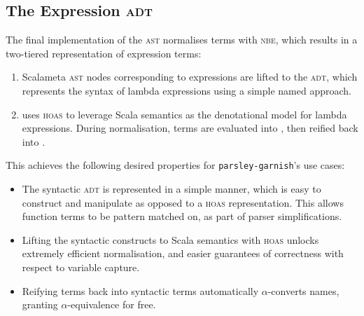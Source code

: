 \documentclass[../../../main.tex]{subfiles}
\begin{document}
\subsection{The Expression \textsc{adt}}
The final implementation of the  \textsc{ast} normalises terms with \textsc{nbe}, which results in a two-tiered representation of expression terms:
\begin{enumerate}
  \item Scalameta \textsc{ast} nodes corresponding to expressions are lifted to the  \textsc{adt}, which represents the syntax of lambda expressions using a simple named approach.
  \item {} uses \textsc{hoas} to leverage Scala semantics as the denotational model for lambda expressions. During normalisation,  terms are evaluated into , then reified back into .
\end{enumerate}
%
This achieves the following desired properties for \texttt{parsley-garnish}'s use cases:
\begin{itemize}
  \item The syntactic  \textsc{adt} is represented in a simple manner, which is easy to construct and manipulate as opposed to a \textsc{hoas} representation. This allows function terms to be pattern matched on, as part of parser simplifications.
  \item Lifting the syntactic constructs to Scala semantics with \textsc{hoas} unlocks extremely efficient normalisation, and easier guarantees of correctness with respect to variable capture.
  \item Reifying  terms back into syntactic  terms automatically $\alpha$-converts names, granting $\alpha$-equivalence for free.
\end{itemize}
%
%
\end{document}
